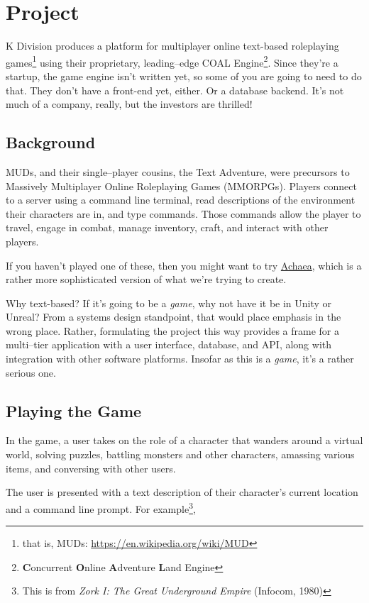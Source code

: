 \documentclass{article}
\newcommand{\enterProblemHeader}[1]{
}
\newcommand{\exitProblemHeader}[1]{
\nobreak\extramarks{#1}{}\nobreak
}
\newcounter{homeworkProblemCounter} %
\newcommand{\homeworkProblemName}{}
\newenvironment{homeworkProblem}[1][Problem \arabic{homeworkProblemCounter}]{ %
\stepcounter{homeworkProblemCounter} %
\renewcommand{\homeworkProblemName}{#1} %
\section{\homeworkProblemName} %
\enterProblemHeader{\homeworkProblemName} %
}{
\exitProblemHeader{\homeworkProblemName} %
}
\newcommand{\homeworkSectionName}{}
\newenvironment{homeworkSection}[1]{ %
\renewcommand{\homeworkSectionName}{#1} %
\subsection{\homeworkSectionName} %
\enterProblemHeader{\homeworkProblemName\ [\homeworkSectionName]} %
}{
\enterProblemHeader{\homeworkProblemName} %
}
\begin{document}
\begin{homeworkProblem}[Project]

  K Division produces a platform for multiplayer online text-based roleplaying games\footnote{that is, MUDs: \url{https://en.wikipedia.org/wiki/MUD}} using their proprietary, leading--edge COAL Engine\footnote{\textbf{C}oncurrent \textbf{O}nline \textbf{A}dventure \textbf{L}and Engine}. Since they're a startup, the game engine isn't written yet, so some of you are going to need to do that. They don't have a front-end yet, either. Or a database backend. It's not much of a company, really, but the investors are thrilled!


\begin{homeworkSection}{Background}
	MUDs, and their single--player cousins, the Text Adventure, were precursors to Massively Multiplayer Online Roleplaying Games (MMORPGs). Players connect to a server using a command line terminal, read descriptions of the environment their characters are in, and type commands. Those commands allow the player to travel, engage in combat, manage inventory, craft, and interact with other players.
	
	If you haven't played one of these, then you might want to try \href{https://play.achaea.com/}{Achaea}, which is a rather more sophisticated version of what we're trying to create.

	Why text-based? If it's going to be a \textit{game}, why not have it be in Unity or Unreal? From a systems design standpoint, that would place emphasis in the wrong place. Rather, formulating the project this way provides a frame for a multi--tier application with a user interface, database, and API, along with integration with other software platforms. Insofar as this is a \textit{game}, it's a rather serious one.
\end{homeworkSection}

\begin{homeworkSection}{Playing the Game}
	In the game, a user takes on the role of a character that wanders around a virtual world, solving puzzles, battling monsters and other characters, amassing various items, and conversing with other users.
	
	The user is presented with a text description of their character's current location and a command line prompt. For example\footnote{This is from \textit{Zork I: The Great Underground Empire} (Infocom, 1980)},


\end{homeworkSection}
\end{homeworkProblem}
\end{document}
